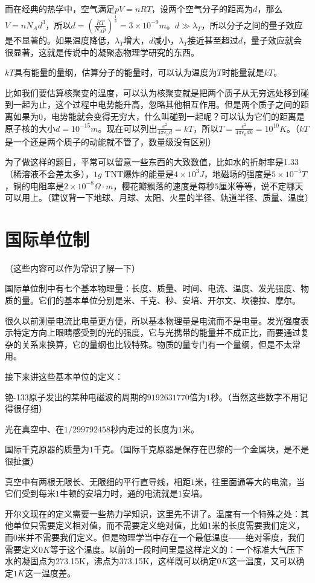 而在经典的热学中，空气满足$p V=n R T$，设两个空气分子的距离为$d$，那么$V=n N_A d^3$，所以$d=(\frac{R T}{N_A p})^{\frac{1}{3}}=3 \times 10^{-9} \unit{m}$。$d \gg \lambda_T$，所以分子之间的量子效应是不显著的。如果温度降低，$\lambda_T$增大，$d$减小，$\lambda_T$接近甚至超过$d$，量子效应就会很显著，这就是传说中的凝聚态物理学研究的东西。

$k T$具有能量的量纲，估算分子的能量时，可以认为温度为$T$时能量就是$k T$。

比如我们要估算核聚变的温度，可以认为核聚变就是把两个质子从无穷远处移到碰到一起为止，这个过程中电势能升高，忽略其他相互作用。但是两个质子之间的距离如果为$0$，电势能就会变得无穷大，什么叫碰到一起呢？可以认为它们的距离是原子核的大小$d=10^{-15} \unit{m}$。现在可以列出$\frac{e^2}{4 \pi \epsilon_0 d}=k T$，所以$T=\frac{e^2}{4 \pi \epsilon_0 d k}=10^{10} \unit{K}$。（$k T$是一个还是两个质子的动能就不管了，数量级没有区别）

为了做这样的题目，平常可以留意一些东西的大致数值，比如水的折射率是1.33（稀溶液不会差太多），$1 \unit{g}$ TNT爆炸的能量是$4 \times 10^3 \unit{J}$，地磁场的强度是$5 \times 10^{-5} \unit{T}$，铜的电阻率是$2 \times 10^{-8} \unit{\Omega \cdot m}$，樱花瓣飘落的速度是每秒$5$厘米等等，说不定哪天可以用上。（建议背一下地球、月球、太阳、火星的半径、轨道半径、质量、温度）
\section{国际单位制}
（这些内容可以作为常识了解一下）

国际单位制中有七个基本物理量：长度、质量、时间、电流、温度、发光强度、物质的量。它们的基本单位分别是米、千克、秒、安培、开尔文、坎德拉、摩尔。

很久以前测量电流比电量更方便，所以基本物理量是电流而不是电量。发光强度表示特定方向上眼睛感受到的光的强度，它与光携带的能量并不成正比，而要通过复杂的关系来换算，它的量纲也比较特殊。物质的量专门有一个量纲，但是不太常用。

接下来讲这些基本单位的定义：

铯-133原子发出的某种电磁波的周期的$9192631770$倍为$1$秒。（当然这些数字不用记得很仔细）

光在真空中、在$1/299792458$秒内走过的长度为$1$米。

国际千克原器的质量为$1$千克。（国际千克原器是保存在巴黎的一个金属块，是不是很扯蛋）

真空中有两根无限长、无限细的平行直导线，相距$1$米，往里面通等大的电流，当它们受到每米$1$牛顿的安培力时，通的电流就是$1$安培。

开尔文现在的定义需要一些热力学知识，这里先不讲了。温度有一个特殊之处：其他单位只需要定义相对值，而不需要定义绝对值，比如$1$米的长度需要我们定义，而$0$米并不需要我们定义。但是物理学当中存在一个最低温度——绝对零度，我们需要定义$0 \unit{K}$等于这个温度。以前的一段时间里是这样定义的：一个标准大气压下水的凝固点为273.15K，沸点为373.15K，这样既可以确定$0 \unit{K}$这一温度，又可以确定$1 \unit{K}$这一温度差。

